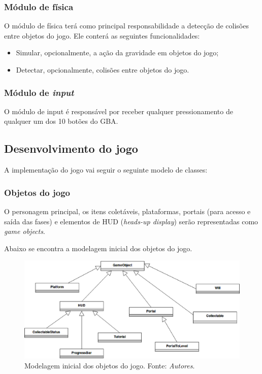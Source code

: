     \subsubsection{Módulo de física}

      O módulo de física terá como principal responsabilidade a detecção de colisões entre objetos do jogo. Ele conterá as seguintes funcionalidades:

      \begin{itemize}
        \item Simular, opcionalmente, a ação da gravidade em objetos do jogo;
        \item Detectar, opcionalmente, colisões entre objetos do jogo.
      \end{itemize}

    \subsubsection{Módulo de \textit{input}}

      O módulo de input é responsável por receber qualquer pressionamento de qualquer um dos 10 botões do GBA.

  \subsection{Desenvolvimento do jogo}

    A implementação do jogo vai seguir o seguinte modelo de classes:

    \subsubsection{Objetos do jogo}

      O personagem principal, os itens coletáveis, plataformas, portais (para acesso e saída das fases) e elementos de HUD (\textit{heads-up display}) serão representadas como \textit{game objects}.

      Abaixo se encontra a modelagem inicial dos objetos do jogo.

      \begin{figure}[H]
        \centering \includegraphics[keepaspectratio=true,scale=0.6]{figuras/class-diagram-1.eps}
        \caption{Modelagem inicial dos objetos do jogo. Fonte: \textit{Autores}.}
        \label{game-object-children}
      \end{figure}

